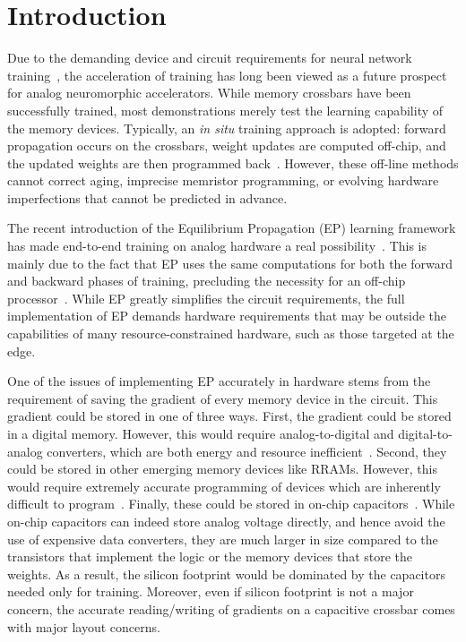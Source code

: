 \section{Introduction}
\label{sec:introduction}

Due to the demanding device and circuit requirements for neural network
training~\cite{burr2017neuromorphic, gokmen2016}, the acceleration of training
has long been viewed as a future prospect for analog neuromorphic accelerators.
While memory crossbars have been successfully trained, most demonstrations
merely test the learning capability of the memory devices. Typically, an
\emph{in situ} training approach is adopted: forward propagation occurs on the
crossbars, weight updates are computed off-chip, and the updated weights are
then programmed back~\cite{kataeva2015}. However, these off-line methods cannot
correct aging, imprecise memristor programming, or evolving hardware
imperfections that cannot be predicted in advance.

The recent introduction of the Equilibrium Propagation (EP) learning framework
has made end-to-end training on analog hardware a real
possibility~\cite{scellier2017equilibrium}. This is mainly due to the fact that
EP uses the same computations for both the forward and backward phases of
training, precluding the necessity for an off-chip processor~\cite{kandel2020}.
While EP greatly simplifies the circuit requirements, the full implementation
of EP demands hardware requirements that may be outside the capabilities of
many resource-constrained hardware, such as those targeted at the edge.

One of the issues of implementing EP accurately in hardware stems from the
requirement of saving the gradient of every memory device in the circuit. This
gradient could be stored in one of three ways. First, the gradient could be
stored in a digital memory. However, this would require analog-to-digital and
digital-to-analog converters, which are both energy and resource
inefficient~\cite{xia2016conv}. Second, they could be stored in other emerging
memory devices like RRAMs. However, this would require extremely accurate
programming of devices which are inherently difficult to
program~\cite{ambrogio2018, gokmen2020, gokmen2021, song2024}. Finally, these
could be stored in on-chip capacitors~\cite{ambrogio2018}. While on-chip
capacitors can indeed store analog voltage directly, and hence avoid the use of
expensive data converters, they are much larger in size compared to the
transistors that implement the logic or the memory devices that store the
weights. As a result, the silicon footprint would be dominated by the
capacitors needed only for training. Moreover, even if silicon footprint is not
a major concern, the accurate reading/writing of gradients on a capacitive
crossbar comes with major layout concerns.

